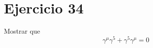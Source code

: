 \section*{Ejercicio 34}
Mostrar que
\begin{equation*}
    \gamma^\mu \gamma^5 + \gamma^5 \gamma^\mu  =0
\end{equation*}